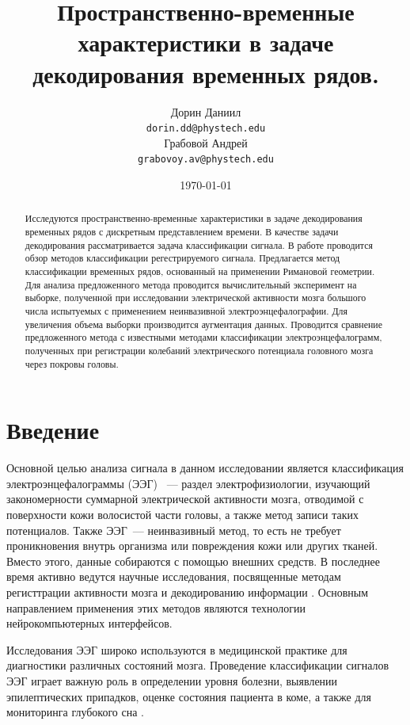 \documentclass[a4paper, 12pt]{extarticle}
\title{Пространственно-временные характеристики в задаче декодирования временных рядов.}
\author{
	Дорин Даниил \\
	\texttt{dorin.dd@phystech.edu} \\
	\And
	Грабовой Андрей \\
	\texttt{grabovoy.av@phystech.edu}
}
\date{\today}
\begin{document}
\maketitle

\begin{abstract}

	Исследуются пространственно-временные характеристики в задаче декодирования временных рядов с дискретным представлением времени.
	В качестве задачи декодирования рассматривается задача классификации сигнала. 
	В работе проводится обзор методов классификации регестрируемого сигнала. 
	Предлагается метод классификации временных рядов, основанный на применении Римановой геометрии. 
	Для анализа предложенного метода проводится вычислительный эксперимент на выборке, 
	полученной при исследовании электрической активности мозга большого числа испытуемых с применением неинвазивной электроэнцефалографии. 
	Для увеличения объема выборки производится аугментация данных. 
	Проводится сравнение предложенного метода с известными методами классификации электроэнцефалограмм, полученных при регистрации колебаний электрического 
	потенциала головного мозга через покровы головы.

\end{abstract}


\section{Введение}

\indent Основной целью анализа сигнала в данном исследовании является 
классификация электроэнцефалограммы (ЭЭГ) \citep{teplan2002fundamentals, beniczky2020electroencephalography}~--- раздел электрофизиологии, 
изучающий закономерности суммарной электрической активности мозга, 
отводимой с поверхности кожи волосистой части головы, 
а также метод записи таких потенциалов. Также ЭЭГ~--- неинвазивный метод, то есть 
не требует проникновения внутрь организма или повреждения кожи или других тканей. 
Вместо этого, данные собираются с помощью внешних средств. 
В последнее время активно ведутся научные исследования, 
посвященные методам регисттрации активности мозга и декодированию 
информации \citep{siuly2016eeg, craik2019deep}. Основным направлением применения 
этих методов являются технологии нейрокомпьютерных интерфейсов.

Исследования ЭЭГ широко используются в медицинской практике для диагностики 
различных состояний мозга. Проведение классификации сигналов ЭЭГ играет важную роль в определении 
уровня болезни, выявлении эпилептических припадков, оценке состояния пациента в коме, а 
также для мониторинга глубокого сна \citep{smith2005eeg, gajic2014classification}.
\end{document}
